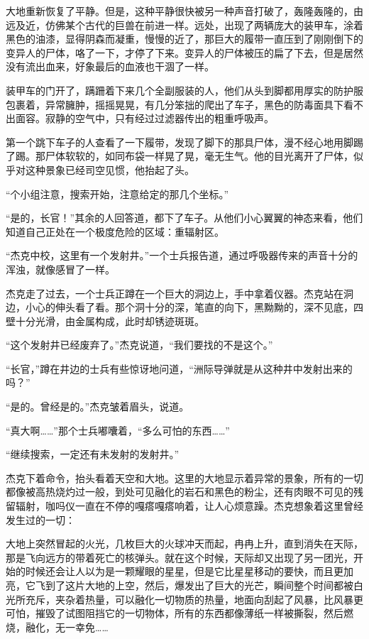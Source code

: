 大地重新恢复了平静。但是，这种平静很快被另一种声音打破了，轰隆轰隆的，由远及近，仿佛某个古代的巨兽在前进一样。远处，出现了两辆庞大的装甲车，涂着黑色的油漆，显得阴森而凝重，慢慢的近了，那巨大的履带一直压到了刚刚倒下的变异人的尸体，咯了一下，才停了下来。变异人的尸体被压的扁了下去，但是居然没有流出血来，好象最后的血液也干涸了一样。

装甲车的门开了，蹒跚着下来几个全副服装的人，他们从头到脚都用厚实的防护服包裹着，异常臃肿，摇摇晃晃，有几分笨拙的爬出了车子，黑色的防毒面具下看不出面容。寂静的空气中，只有经过过滤器传出的粗重呼吸声。

第一个跳下车子的人查看了一下履带，发现了脚下的那具尸体，漫不经心地用脚踢了踢。那尸体软软的，如同布袋一样晃了晃，毫无生气。他的目光离开了尸体，似乎对这种景象已经司空见惯，他抬起了头。

“个小组注意，搜索开始，注意给定的那几个坐标。”

“是的，长官！”其余的人回答道，都下了车子。从他们小心翼翼的神态来看，他们知道自己正处在一个极度危险的区域：重辐射区。

“杰克中校，这里有一个发射井。”一个士兵报告道，通过呼吸器传来的声音十分的浑浊，就像感冒了一样。

杰克走了过去，一个士兵正蹲在一个巨大的洞边上，手中拿着仪器。杰克站在洞边，小心的伸头看了看。那个洞十分的深，笔直的向下，黑黝黝的，深不见底，四壁十分光滑，由金属构成，此时却锈迹斑斑。

“这个发射井已经废弃了。”杰克说道，“我们要找的不是这个。”

“长官，”蹲在井边的士兵有些惊讶地问道，“洲际导弹就是从这种井中发射出来的吗？”

“是的。曾经是的。”杰克皱着眉头，说道。

“真大啊……”那个士兵嘟囔着，“多么可怕的东西……”

“继续搜索，一定还有未发射的发射井。”

杰克下着命令，抬头看着天空和大地。这里的大地显示着异常的景象，所有的一切都像被高热烧灼过一般，到处可见融化的岩石和黑色的粉尘，还有肉眼不可见的残留辐射，咖吗仪一直在不停的嘎瘩嘎瘩响着，让人心烦意躁。杰克想象着这里曾经发生过的一切：

大地上突然冒起的火光，几枚巨大的火球冲天而起，冉冉上升，直到消失在天际，那是飞向远方的带着死亡的核弹头。就在这个时候，天际却又出现了另一团光，开始的时候还会让人以为是一颗耀眼的星星，但是它比星星移动的要快，而且更加亮，它飞到了这片大地的上空，然后，爆发出了巨大的光芒，瞬间整个时间都被白光所充斥，夹杂着热量，可以融化一切物质的热量，地面向刮起了风暴，比风暴更可怕，摧毁了试图阻挡它的一切物体，所有的东西都像薄纸一样被撕裂，然后燃烧，融化，无一幸免……

